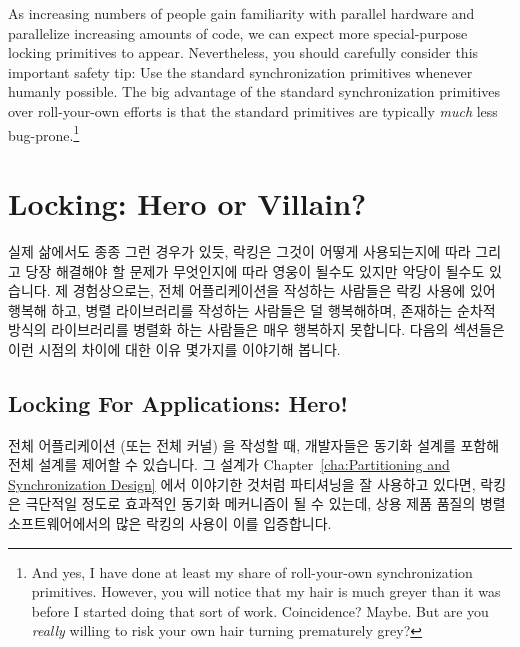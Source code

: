 As increasing numbers of people gain familiarity with parallel hardware
and parallelize increasing amounts of code, we can expect more
special-purpose locking primitives to appear.
Nevertheless, you should carefully consider this important safety tip:
Use the standard synchronization primitives whenever humanly possible.
The big advantage of the standard synchronization primitives over
roll-your-own efforts is that the standard primitives are typically
\emph{much} less bug-prone.\footnote{
	And yes, I have done at least my share of roll-your-own
	synchronization primitives.
	However, you will notice that my hair is much greyer than
	it was before I started doing that sort of work.
	Coincidence?
	Maybe.
	But are you \emph{really} willing to risk your own hair turning
	prematurely grey?}
\fi



\section{Locking: Hero or Villain?}
\label{sec:locking:Locking: Hero or Villain?}

실제 삶에서도 종종 그런 경우가 있듯, 락킹은 그것이 어떻게 사용되는지에 따라
그리고 당장 해결해야 할 문제가 무엇인지에 따라 영웅이 될수도 있지만 악당이
될수도 있습니다.
제 경험상으로는, 전체 어플리케이션을 작성하는 사람들은 락킹 사용에 있어 행복해
하고, 병렬 라이브러리를 작성하는 사람들은 덜 행복해하며, 존재하는 순차적 방식의
라이브러리를 병렬화 하는 사람들은 매우 행복하지 못합니다.
다음의 섹션들은 이런 시점의 차이에 대한 이유 몇가지를 이야기해 봅니다.

\subsection{Locking For Applications: Hero!}
\label{sec:locking:Locking For Applications: Hero!}

전체 어플리케이션 (또는 전체 커널) 을 작성할 때, 개발자들은 동기화 설계를
포함해 전체 설계를 제어할 수 있습니다.
그 설계가 Chapter~\ref{cha:Partitioning and Synchronization Design} 에서
이야기한 것처럼 파티셔닝을 잘 사용하고 있다면, 락킹은 극단적일 정도로 효과적인
동기화 메커니즘이 될 수 있는데, 상용 제품 품질의 병렬 소프트웨어에서의 많은
락킹의 사용이 이를 입증합니다.
\iffalse

